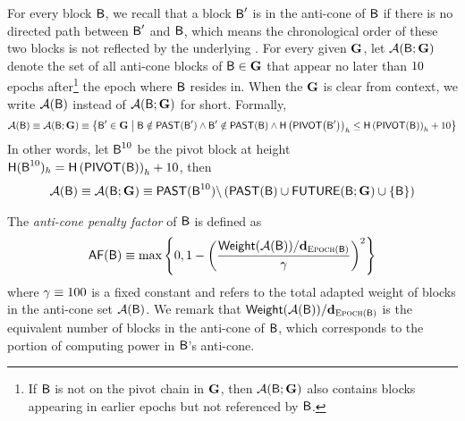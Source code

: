 For every block $\textsf{B}$, we recall that a block $\textsf{B}'$ is in the anti-cone of $\textsf{B}$ if there is no directed path between $\textsf{B}'$ and $\textsf{B}$, which means the chronological order of these two blocks is not reflected by the underlying \tg.
For every given \tg $\textbf{G}$, let $\mathcal{A}(\textsf{B};\textbf{G})$ denote the set of all anti-cone blocks of $\textsf{B}\in\textbf{G}$ that appear no later than ${10}$ epochs after\footnote{If $\textsf{B}$ is not on the pivot chain in $\textbf{G}$, then $\mathcal{A}(\textsf{B};\textbf{G})$ also contains blocks appearing in earlier epochs but not referenced by $\textsf{B}$.} the epoch where $\textsf{B}$ resides in.
When the \tg $\textbf{G}$ is clear from context, we write $\mathcal{A}(\textsf{B})$ instead of $\mathcal{A}(\textsf{B};\textbf{G})$ for short. 
Formally,
\begin{align}
	\mathcal{A}(\textsf{B})\equiv \mathcal{A}(\textsf{B};\textbf{G}) \equiv  {\left \{{\textsf{B}' \in \textbf{G}\;\big|\; \textsf{B}\notin\ensuremath{\mathsf{PAST}}(\textsf{B}') \land \textsf{B}'\notin\ensuremath{\mathsf{PAST}}(\textsf{B})  \land \textsf{H}\left(\ensuremath{\mathsf{PIVOT}{\left({\textsf{B}'} \right)}}\right)_h\le \textsf{H}\left(\ensuremath{\mathsf{PIVOT}{\left({\textsf{B}} \right)}}\right)_h+10 } \right \}}   
\end{align}
In other words, let $\textsf{B}^{10}$ be the pivot block at height $\textsf{H}(\textsf{B}^{10})_h=\textsf{H}\left(\mathsf{PIVOT}{\left({\textsf{B}} \right)}\right)_h+10$,
then 
\begin{align}
	\mathcal{A}(\textsf{B})\equiv \mathcal{A}(\textsf{B};\textbf{G}) \equiv \mathsf{PAST}(\textsf{B}^{10})\backslash\left( \mathsf{PAST}(\textsf{B})\cup \mathsf{FUTURE}(\textsf{B};\textbf{G}) \cup {\left \{{\textsf{B}} \right \}} \right)
\end{align}

The \emph{anti-cone penalty factor} of $\textsf{B}$ is defined as
\begin{align}
	\mathsf{AF}(\textsf{B}) \equiv \max{\left \{{0, 1-\left(\frac{ \ensuremath{\mathsf{Weight}}(\ensuremath{\mathcal{A}}(\textsf{B}))/\mathbf{d}_{\ensuremath{\textsc{Epoch}}(\textsf{B})}
	}{\gamma}\right)^2} \right \}}
\end{align}
where $\gamma\equiv {{100}}$ is a fixed constant and 
 refers to the total {adapted weight} of blocks in the anti-cone set $\mathcal{A}(\textsf{B})$.
We remark that $\mathsf{Weight}(\mathcal{A}(\textsf{B}))/\mathbf{d}_{\textsc{Epoch}(\textsf{B})}$ is the equivalent number of blocks in the anti-cone of $\textsf{B}$, which corresponds to the portion of computing power in $\textsf{B}$'s anti-cone.

